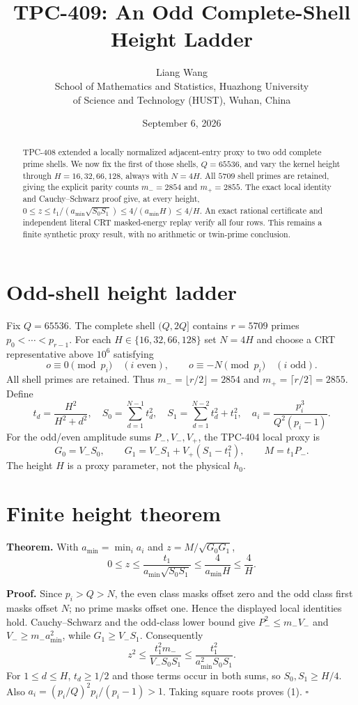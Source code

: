 \documentclass[11pt]{article}
\title{TPC-409: An Odd Complete-Shell Height Ladder}
\author{Liang Wang\\School of Mathematics and Statistics, Huazhong University\\of Science and Technology (HUST), Wuhan, China}
\date{September 6, 2026}
\begin{document}
\maketitle

\begin{abstract}
TPC-408 extended a locally normalized adjacent-entry proxy to two odd
complete prime shells.  We now fix the first of those shells,
$Q=65536$, and vary the kernel height through $H=16,32,66,128$, always with
$N=4H$.  All $5709$ shell primes are retained, giving the explicit parity
counts $m_-=2854$ and $m_+=2855$.  The exact local identity and
Cauchy--Schwarz proof give, at every height,
$0\le z\le t_1/(a_{\min}\sqrt{S_0S_1})\le4/(a_{\min}H)\le4/H$.
An exact rational certificate and independent literal CRT masked-energy
replay verify all four rows.  This remains a finite synthetic proxy result,
with no arithmetic or twin-prime conclusion.
\end{abstract}

\section{Odd-shell height ladder}
Fix $Q=65536$.  The complete shell $(Q,2Q]$ contains $r=5709$ primes
$p_0<\cdots<p_{r-1}$.  For each $H\in\{16,32,66,128\}$ set $N=4H$ and
choose a CRT representative above $10^6$ satisfying
\[
 o\equiv0\pmod {p_i}\quad(i\text{ even}),\qquad
 o\equiv-N\pmod {p_i}\quad(i\text{ odd}).
\]
All shell primes are retained.  Thus $m_-=\lfloor r/2\rfloor=2854$ and
$m_+=\lceil r/2\rceil=2855$.  Define
\[
 t_d=\frac{H^2}{H^2+d^2},\quad S_0=\sum_{d=1}^{N-1}t_d^2,
 \quad S_1=\sum_{d=1}^{N-2}t_d^2+t_1^2,
 \quad a_i=\frac{p_i^3}{Q^2(p_i-1)}.
\]
For the odd/even amplitude sums $P_-,V_-,V_+$, the TPC-404 local proxy is
\[
G_0=V_-S_0,\qquad G_1=V_-S_1+V_+(S_1-t_1^2),\qquad M=t_1P_-.
\]
The height $H$ is a proxy parameter, not the physical $h_0$.

\section{Finite height theorem}
\textbf{Theorem.} With $a_{\min}=\min_i a_i$ and
$z=M/\sqrt{G_0G_1}$,
\[
0\le z\le\frac{t_1}{a_{\min}\sqrt{S_0S_1}}
 \le\frac4{a_{\min}H}\le\frac4H. \tag{1}
\]

\textbf{Proof.} Since $p_i>Q>N$, the even class masks offset zero and the
odd class first masks offset $N$; no prime masks offset one.  Hence the
displayed local identities hold.  Cauchy--Schwarz and the odd-class lower
bound give $P_-^2\le m_-V_-$ and $V_-\ge m_-a_{\min}^2$, while
$G_1\ge V_-S_1$.  Consequently
\[
z^2\le\frac{t_1^2m_-}{V_-S_0S_1}
\le\frac{t_1^2}{a_{\min}^2S_0S_1}.
\]
For $1\le d\le H$, $t_d\ge1/2$ and those terms occur in both sums, so
$S_0,S_1\ge H/4$.  Also
$a_i=(p_i/Q)^2p_i/(p_i-1)>1$.  Taking square roots proves (1). \hfill$\square$
\end{document}
